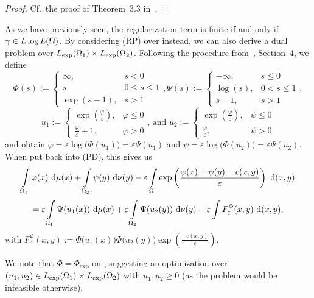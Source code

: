 \begin{proof}
	Cf.~the proof of Theorem~3.3 in~\cite{Cla2021}.
\end{proof}

As we have previously seen, the regularization term is finite if and only if $\gamma \in \LLL$. By considering (RP) over \LLL{} instead, we can also derive a dual problem over $\Lexp[\Omega_1] \times \Lexp[\Omega_2]$. Following the procedure from~\cite{Cla2021}, Section~4, we define
\[ \Phi(s) := \begin{cases}
	\infty, & s < 0 \\
	s, & 0 \le s \le 1 \\
	\exp(s - 1), & s > 1
\end{cases}, \Psi(s) := \begin{cases}
	- \infty, & s \le 0 \\
	\log(s), & 0 < s \le 1 \\
	s - 1, & s > 1
\end{cases}, \]
\[ u_1 := \begin{cases}
	\exp \left( \frac{\varphi}{\varepsilon} \right), & \varphi \le 0 \\
	\frac{\varphi}{\varepsilon} + 1, & \varphi > 0
\end{cases} \text{, and } u_2 := \begin{cases}
	\exp \left( \frac{\psi}{\varepsilon} \right), & \psi \le 0 \\
	\frac{\psi}{\varepsilon}, & \psi > 0
\end{cases} \]
and obtain $\varphi = \varepsilon \log \big( \Phi(u_1) \big) = \varepsilon \Psi(u_1) \text{ and } \psi = \varepsilon \log \big( \Phi(u_2) \big) = \varepsilon \Psi(u_2)$. When put back into (PD), this gives us
\[ \int\limits_{\Omega_1} \varphi(x)~\Dx{\mu} + \int\limits_{\Omega_2} \psi(y)~\Dx[y]{\nu} - \varepsilon \int\limits_{\Omega} \exp \left( \frac{\varphi(x) + \psi(y) - c(x, y)}{\varepsilon} \right)~\Dx[x, y]{} \]
\[ = \varepsilon \int\limits_{\Omega_1} \Psi(u_1(x))~\Dx{\mu} + \varepsilon \int\limits_{\Omega_2} \Psi(u_2(y))~\Dx[y]{\nu} - \varepsilon \int\limits F_{\varepsilon}^{\Phi}(x, y)~\Dx[x, y]{}, \]
with $F_{\varepsilon}^{\Phi}(x, y) := \Phi\big( u_1(x) \big) \Phi\big( u_2(y) \big) \exp\left( \frac{-c(x, y)}{\varepsilon} \right)$.

We note that $\Phi = \Phi_{\exp}$ on \RZero, suggesting an optimization over ${(u_1, u_2)} \in \Lexp[\Omega_1] \times \Lexp[\Omega_2]$ with $u_1, u_2 \ge 0$ (as the problem would be infeasible otherwise).

